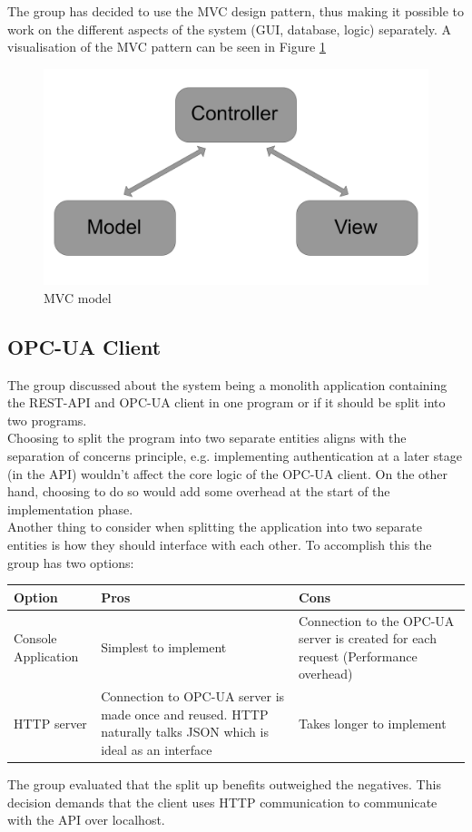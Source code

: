The group has decided to use the MVC design pattern, thus making it possible to
work on the different aspects of the system (GUI, database, logic) separately. 
A visualisation of the MVC pattern can be seen in Figure \ref{figure:MVC_model}

\begin{figure}[H]
    \centering
    \includegraphics[scale=0.15]{images/MVC_model.png}
    \caption{MVC model}
    \label{figure:MVC_model}
\end{figure}

\subsection{OPC-UA Client}
The group discussed about the system being a monolith application containing 
the REST-API and OPC-UA client in one program or if it should be split into two
programs.\\

Choosing to split the program into two separate entities aligns with the 
separation of concerns principle, e.g. implementing authentication at a later 
stage (in the API) wouldn't affect the core logic of the OPC-UA client. On the 
other hand, choosing to do so would add some overhead at the start of the 
implementation phase. \\

Another thing to consider when splitting the application into two separate 
entities is how they should interface with each other. To accomplish this the 
group has two options: 

\begin{table}[ht]
    \begin{tabularx}{\textwidth}{|>{\RaggedRight}X|>{\RaggedRight}X|>{\RaggedRight}X|}
        \hline
        \textbf{Option} & \textbf{Pros} & \textbf{Cons} \\
        \hline
        Console Application & Simplest to implement & Connection to the OPC-UA 
        server is created for each request (Performance overhead)\\
        \hline
        HTTP server & Connection to OPC-UA server is made once and reused. HTTP
        naturally talks JSON which is ideal as an interface & Takes longer to 
        implement \\
        \hline
    \end{tabularx}
    \label{someLabel}
\end{table}

The group evaluated that the split up benefits outweighed the negatives. This 
decision demands that the client uses HTTP communication to communicate with the
API over localhost. 
